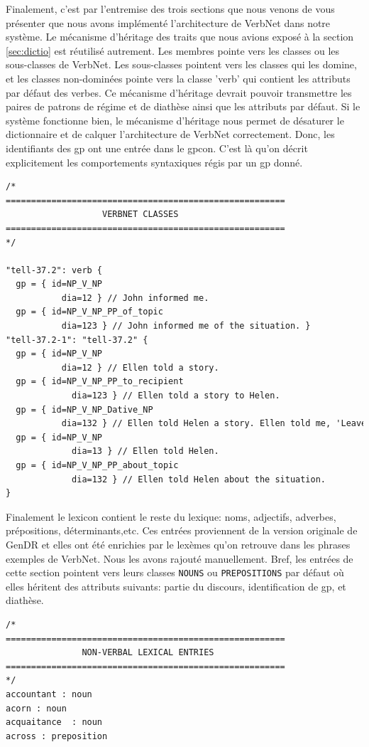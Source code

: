 Finalement, c'est par l'entremise des trois sections que nous venons de vous présenter que nous avons implémenté l'architecture de VerbNet dans notre système. Le mécanisme d'héritage des traits que nous avions exposé à la section \ref{sec:dictio} est réutilisé autrement. Les membres pointe vers les classes ou les sous-classes de VerbNet. Les sous-classes pointent vers les classes qui les domine, et les classes non-dominées pointe vers la classe 'verb' qui contient les attributs par défaut des verbes. Ce mécanisme d'héritage devrait pouvoir transmettre les paires de patrons de régime et de diathèse ainsi que les attributs par défaut. Si le système fonctionne bien, le mécanisme d'héritage nous permet de désaturer le dictionnaire et de calquer l'architecture de VerbNet correctement. Donc, les identifiants des gp ont une entrée dans le gpcon. C'est là qu'on décrit explicitement les comportements syntaxiques régis par un gp donné.

\begin{lstlisting}[language=XML, caption = Partie: Classes de VerbNet]
/*
=======================================================
                   VERBNET CLASSES
=======================================================
*/

"tell-37.2": verb {
  gp = { id=NP_V_NP  
	       dia=12 } // John informed me.
  gp = { id=NP_V_NP_PP_of_topic  
	       dia=123 } // John informed me of the situation. }
"tell-37.2-1": "tell-37.2" {
  gp = { id=NP_V_NP  
	       dia=12 } // Ellen told a story.
  gp = { id=NP_V_NP_PP_to_recipient 
		     dia=123 } // Ellen told a story to Helen.
  gp = { id=NP_V_NP_Dative_NP   
	       dia=132 } // Ellen told Helen a story. Ellen told me, 'Leave the room.'
  gp = { id=NP_V_NP
		     dia=13 } // Ellen told Helen.
  gp = { id=NP_V_NP_PP_about_topic
		     dia=132 } // Ellen told Helen about the situation.
}
\end{lstlisting}

Finalement le lexicon contient le reste du lexique: noms, adjectifs, adverbes, prépositions, déterminants,etc. Ces entrées proviennent de la version originale de GenDR \citep{lareau18} et elles ont été enrichies par le lexèmes qu'on retrouve dans les phrases exemples de VerbNet. Nous les avons rajouté manuellement. Bref, les entrées de cette section pointent vers leurs classes \texttt{NOUNS} ou \texttt{PREPOSITIONS} par défaut où elles héritent des attributs suivants: partie du discours, identification de gp, et diathèse.

\begin{lstlisting}[language=XML, caption = Partie: Unités lexicales non-verbales]
/*
=======================================================
               NON-VERBAL LEXICAL ENTRIES     
=======================================================
*/
accountant : noun
acorn : noun
acquaitance  : noun
across : preposition
\end{lstlisting}

